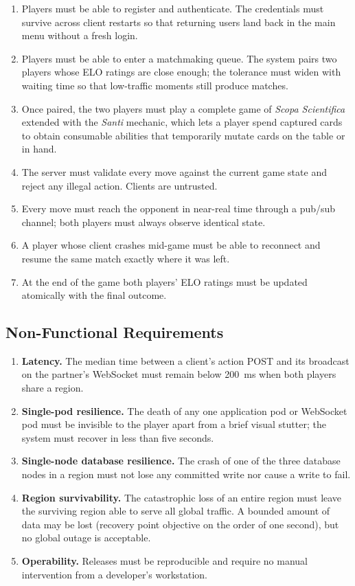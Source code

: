 \documentclass{scrartcl}
\begin{document}
\begin{enumerate}[label=F\arabic*., leftmargin=2em]
  \item Players must be able to register and authenticate. The credentials
  must survive across client restarts so that returning users land back in
  the main menu without a fresh login.
  \item Players must be able to enter a matchmaking queue. The system
  pairs two players whose ELO ratings are close enough; the tolerance
  must widen with waiting time so that low-traffic moments still produce
  matches.
  \item Once paired, the two players must play a complete game of
  \emph{Scopa Scientifica} extended with the \emph{Santi} mechanic, which
  lets a player spend captured cards to obtain consumable abilities that
  temporarily mutate cards on the table or in hand.
  \item The server must validate every move against the current game
  state and reject any illegal action. Clients are untrusted.
  \item Every move must reach the opponent in near-real time through a
  pub/sub channel; both players must always observe identical state.
  \item A player whose client crashes mid-game must be able to reconnect
  and resume the same match exactly where it was left.
  \item At the end of the game both players' ELO ratings must be updated
  atomically with the final outcome.
\end{enumerate}

\subsection{Non-Functional Requirements}

\begin{enumerate}[label=NF\arabic*., leftmargin=2em]
  \item \textbf{Latency.} The median time between a client's action POST
  and its broadcast on the partner's WebSocket must remain below 200~ms
  when both players share a region.
  \item \textbf{Single-pod resilience.} The death of any one application
  pod or WebSocket pod must be invisible to the player apart from a brief
  visual stutter; the system must recover in less than five seconds.
  \item \textbf{Single-node database resilience.} The crash of one of the
  three database nodes in a region must not lose any committed write nor
  cause a write to fail.
  \item \textbf{Region survivability.} The catastrophic loss of an entire
  region must leave the surviving region able to serve all global
  traffic. A bounded amount of data may be lost (recovery point
  objective on the order of one second), but no global outage is
  acceptable.
  \item \textbf{Operability.} Releases must be reproducible and require no
  manual intervention from a developer's workstation.
\end{enumerate}
\end{document}
